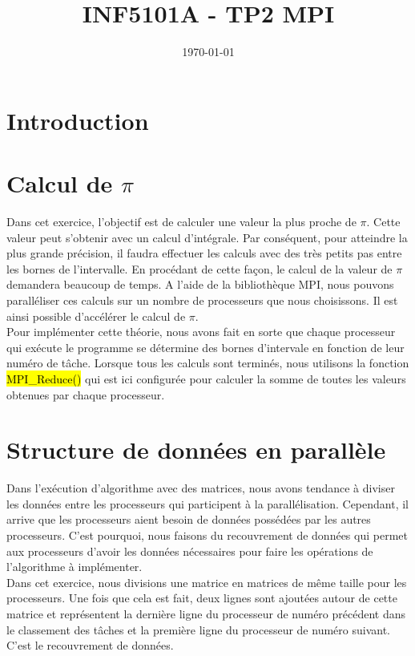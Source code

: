 \documentclass[a4paper,table]{article}
\title{INF5101A - TP2 MPI}
\date{\today}
\begin{document}
\maketitle
\newpage
\tableofcontents
\newpage

\section{Introduction}


\section{Calcul de $\pi$}

Dans cet exercice, l'objectif est de calculer une valeur la plus proche de
$\pi$. Cette valeur peut s'obtenir avec un calcul d'intégrale. Par conséquent,
pour atteindre la plus grande précision, il faudra effectuer les calculs avec
des très petits pas entre les bornes de l'intervalle. En procédant de cette
façon, le calcul de la valeur de $\pi$ demandera beaucoup de temps. A l'aide de
la bibliothèque MPI, nous pouvons paralléliser ces calculs sur un nombre de
processeurs que nous choisissons. Il est ainsi possible d'accélérer le calcul
de $\pi$. \\

Pour implémenter cette théorie, nous avons fait en sorte que chaque processeur
qui exécute le programme se détermine des bornes d'intervale en fonction de
leur numéro de tâche. Lorsque tous les calculs sont terminés, nous utilisons la
fonction \hl{MPI\_Reduce()} qui est ici configurée pour calculer la somme de
toutes les valeurs obtenues par chaque processeur.

\section{Structure de données en parallèle}

Dans l'exécution d'algorithme avec des matrices, nous avons tendance à diviser
les données entre les processeurs qui participent à la parallélisation.
Cependant, il arrive que les processeurs aient besoin de données possédées par
les autres processeurs. C'est pourquoi, nous faisons du recouvrement de données
qui permet aux processeurs d'avoir les données nécessaires pour faire les
opérations de l'algorithme à implémenter. \\

Dans cet exercice, nous divisions une matrice en matrices de même taille pour
les processeurs. Une fois que cela est fait, deux lignes sont ajoutées autour
de cette matrice et représentent la dernière ligne du processeur de numéro
précédent dans le classement des tâches et la première ligne du processeur de
numéro suivant. C'est le recouvrement de données.

\end{document}
